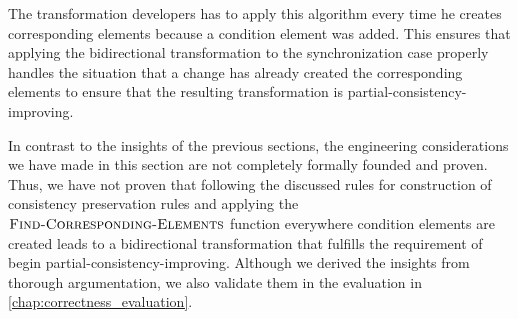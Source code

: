 The transformation developers has to apply this algorithm every time he creates corresponding elements because a condition element was added.
This ensures that applying the bidirectional transformation to the synchronization case properly handles the situation that a change has already created the corresponding elements to ensure that the resulting transformation is partial-consistency-improving.

In contrast to the insights of the previous sections, the engineering considerations we have made in this section are not completely formally founded and proven.
Thus, we have not proven that following the discussed rules for construction of consistency preservation rules and applying the $\textsc{Find-Corresponding-Elements}$ function everywhere condition elements are created leads to a bidirectional transformation that fulfills the requirement of begin partial-consistency-improving.
Although we derived the insights from thorough argumentation, we also validate them in the evaluation in \autoref{chap:correctness_evaluation}.



